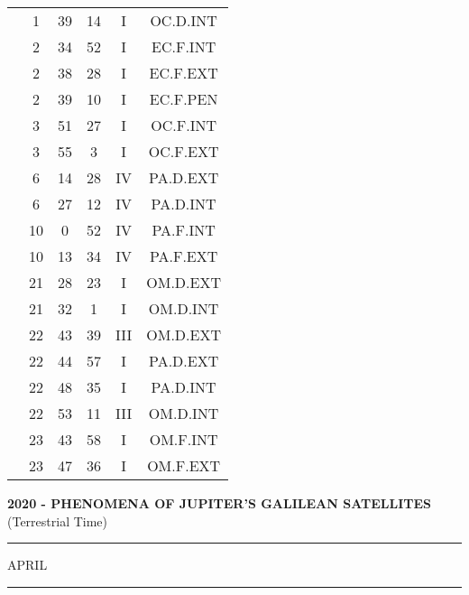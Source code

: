 \documentclass[12pt, a4paper]{article}
\begin{document}
\begin{multicols}{3}
{\begin{tabular}{c c c c c c}
	 	 	 	 & 1 & 39 & 14 & I & OC.D.INT\\%
	 	 	 	 & 2 & 34 & 52 & I & EC.F.INT\\%
	 	 	 	 & 2 & 38 & 28 & I & EC.F.EXT\\%
	 	 	 	 & 2 & 39 & 10 & I & EC.F.PEN\\%
	 	 	 	 & 3 & 51 & 27 & I & OC.F.INT\\%
	 	 	 	 & 3 & 55 & 3 & I & OC.F.EXT\\%
	 	 	 	 & 6 & 14 & 28 & IV & PA.D.EXT\\%
	 	 	 	 & 6 & 27 & 12 & IV & PA.D.INT\\%
	 	 	 	 & 10 & 0 & 52 & IV & PA.F.INT\\%
	 	 	 	 & 10 & 13 & 34 & IV & PA.F.EXT\\%
	 	 	 	 & 21 & 28 & 23 & I & OM.D.EXT\\%
	 	 	 	 & 21 & 32 & 1 & I & OM.D.INT\\%
	 	 	 	 & 22 & 43 & 39 & III & OM.D.EXT\\%
	 	 	 	 & 22 & 44 & 57 & I & PA.D.EXT\\%
	 	 	 	 & 22 & 48 & 35 & I & PA.D.INT\\%
	 	 	 	 & 22 & 53 & 11 & III & OM.D.INT\\%
	 	 	 	 & 23 & 43 & 58 & I & OM.F.INT\\%
	 	 	 	 & 23 & 47 & 36 & I & OM.F.EXT\\%
	 	 \end{tabular}
 	}
\end{multicols}
\textbf{2020 - PHENOMENA OF JUPITER'S GALILEAN SATELLITES}\\(Terrestrial Time) 
\vspace{0.1cm} \hrule \vspace{0.1cm}
APRIL\vspace{0.1cm}
\hrule
\vspace{-0.2cm}
\end{document}
